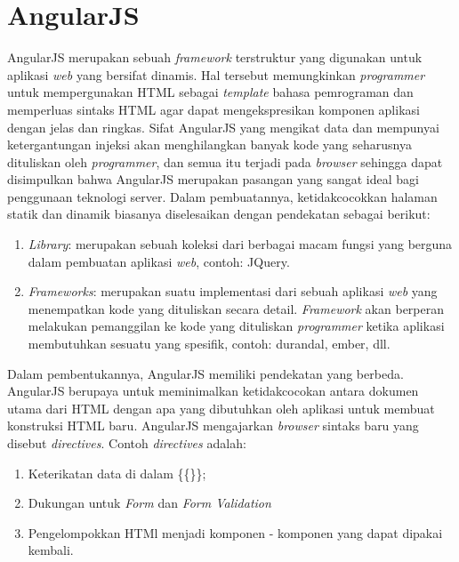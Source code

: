 \section{AngularJS}
\label{sec: angularJS}

AngularJS\cite{AngularJSDocs} merupakan sebuah \textit{framework} terstruktur yang digunakan untuk aplikasi \textit{web} yang bersifat dinamis. Hal tersebut memungkinkan \textit{programmer} untuk mempergunakan HTML sebagai \textit{template} bahasa pemrograman dan memperluas sintaks HTML agar dapat mengekspresikan komponen aplikasi dengan jelas dan ringkas. Sifat AngularJS yang mengikat data dan mempunyai ketergantungan injeksi akan menghilangkan banyak kode yang seharusnya dituliskan oleh \textit{programmer}, dan semua itu terjadi pada \textit{browser} sehingga dapat disimpulkan bahwa AngularJS merupakan pasangan yang sangat ideal bagi penggunaan teknologi server. 
Dalam pembuatannya, ketidakcocokkan halaman statik dan dinamik biasanya diselesaikan dengan pendekatan sebagai berikut:
\begin{enumerate}
	\item \textit{Library}: merupakan sebuah koleksi dari berbagai macam fungsi yang berguna dalam pembuatan aplikasi \textit{web}, contoh: JQuery.
	\item \textit{Frameworks}: merupakan suatu implementasi dari sebuah aplikasi \textit{web} yang menempatkan kode yang dituliskan secara detail. \textit{Framework} akan berperan melakukan pemanggilan ke kode yang dituliskan \textit{programmer} ketika aplikasi membutuhkan sesuatu yang spesifik, contoh: durandal, ember, dll.
\end{enumerate}

Dalam pembentukannya, AngularJS memiliki pendekatan yang berbeda. AngularJS berupaya untuk meminimalkan ketidakcocokan antara dokumen utama dari HTML dengan apa yang dibutuhkan oleh aplikasi untuk membuat konstruksi HTML baru. AngularJS mengajarkan \textit{browser} sintaks baru yang disebut \textit{directives}. Contoh \textit{directives} adalah:
\begin{enumerate}
	\item Keterikatan data di dalam \{\{\}\};
	\item Dukungan untuk \textit{Form} dan \textit{Form Validation}
	\item Pengelompokkan HTMl menjadi komponen - komponen yang dapat dipakai kembali.
\end{enumerate}

